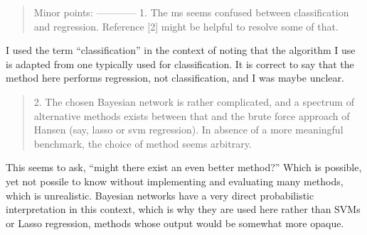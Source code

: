 \documentclass{article}
\begin{document}
\begin{quote}
Minor points:
------------
1. The ms seems confused between classification and regression.
Reference [2] might be helpful to resolve some of that.
\end{quote}

I used the term ``classification'' in the context of noting that the algorithm I
use is adapted from one typically used for classification. It is correct to say
that the method here performs regression, not classification, and I was maybe
unclear.



\begin{quote}
2. The chosen Bayesian network is rather complicated, and a spectrum
of alternative methods exists between that and the brute force
approach of Hansen (say, lasso or svm regression). In absence of a
more meaningful benchmark, the choice of method seems arbitrary.
\end{quote}

This seems to ask, ``might there exist an even better method?'' Which is
possible, yet not possile to know without implementing and evaluating many
methods, which is unrealistic. Bayesian networks have a very direct
probabilistic interpretation in this context, which is why they are used here
rather than SVMs or Lasso regression, methods whose output would be somewhat
more opaque.
\end{document}
